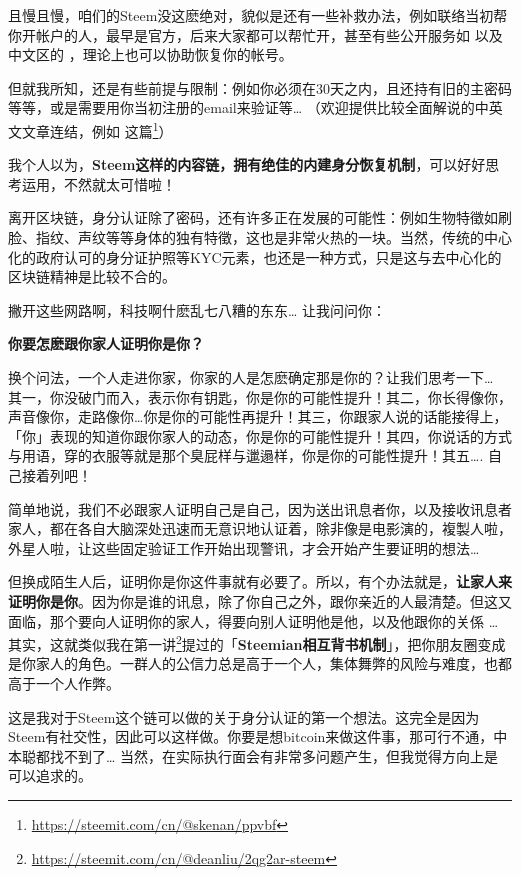 \documentclass[]{ctexbook}
\renewcommand{\href}[2]{#2\footnote{\url{#1}}}
\begin{document}
且慢且慢，咱们的Steem没这麽绝对，貌似是还有一些补救办法，例如联络当初帮你开帐户的人，最早是官方，后来大家都可以帮忙开，甚至有些公开服务如 \citet{anonsteem} \citet{blocktrades} 以及中文区的 \citet{skenan等提供注册服务的}，理论上也可以协助恢复你的帐号。

但就我所知，还是有些前提与限制：例如你必须在30天之内，且还持有旧的主密码等等，或是需要用你当初注册的email来验证等\ldots{} （欢迎提供比较全面解说的中英文文章连结，例如 \citet{skenan的}\href{https://steemit.com/cn/@skenan/ppvbf}{这篇}）

我个人以为，\textbf{Steem这样的内容链，拥有绝佳的内建身分恢复机制}，可以好好思考运用，不然就太可惜啦！

离开区块链，身分认证除了密码，还有许多正在发展的可能性：例如生物特徵如刷脸、指纹、声纹等等身体的独有特徵，这也是非常火热的一块。当然，传统的中心化的政府认可的身分证护照等KYC元素，也还是一种方式，只是这与去中心化的区块链精神是比较不合的。

撇开这些网路啊，科技啊什麽乱七八糟的东东\ldots{} 让我问问你：

\textbf{你要怎麽跟你家人证明你是你？}

换个问法，一个人走进你家，你家的人是怎麽确定那是你的？让我们思考一下\ldots{} 其一，你没破门而入，表示你有钥匙，你是你的可能性提升！其二，你长得像你，声音像你，走路像你\ldots{}你是你的可能性再提升！其三，你跟家人说的话能接得上，「你」表现的知道你跟你家人的动态，你是你的可能性提升！其四，你说话的方式与用语，穿的衣服等就是那个臭屁样与邋遢样，你是你的可能性提升！其五\ldots{}. 自己接着列吧！

简单地说，我们不必跟家人证明自己是自己，因为送出讯息者你，以及接收讯息者家人，都在各自大脑深处迅速而无意识地认证着，除非像是电影演的，複製人啦，外星人啦，让这些固定验证工作开始出现警讯，才会开始产生要证明的想法\ldots{}

但换成陌生人后，证明你是你这件事就有必要了。所以，有个办法就是，\textbf{让家人来证明你是你}。因为你是谁的讯息，除了你自己之外，跟你亲近的人最清楚。但这又面临，那个要向人证明你的家人，得要向别人证明他是他，以及他跟你的关係 \ldots{} 其实，这就类似我在\href{https://steemit.com/cn/@deanliu/2qg2ar-steem}{第一讲}提过的「\textbf{Steemian相互背书机制}」，把你朋友圈变成是你家人的角色。一群人的公信力总是高于一个人，集体舞弊的风险与难度，也都高于一个人作弊。

这是我对于Steem这个链可以做的关于身分认证的第一个想法。这完全是因为Steem有社交性，因此可以这样做。你要是想bitcoin来做这件事，那可行不通，中本聪都找不到了\ldots{} 当然，在实际执行面会有非常多问题产生，但我觉得方向上是可以追求的。
\end{document}
